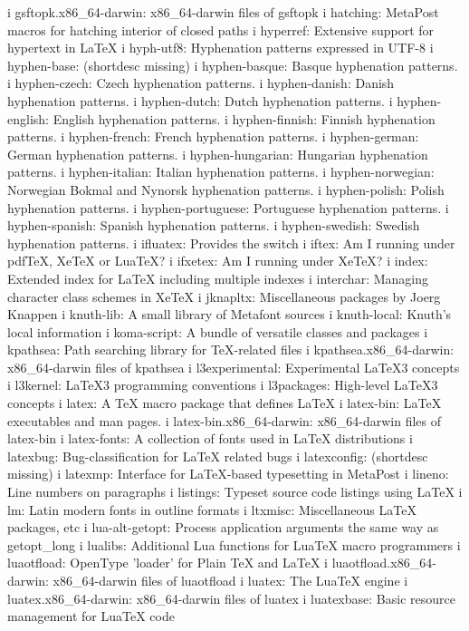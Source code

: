 i gsftopk.x86_64-darwin: x86_64-darwin files of gsftopk
i hatching: MetaPost macros for hatching interior of closed paths
i hyperref: Extensive support for hypertext in LaTeX
i hyph-utf8: Hyphenation patterns expressed in UTF-8
i hyphen-base: (shortdesc missing)
i hyphen-basque: Basque hyphenation patterns.
i hyphen-czech: Czech hyphenation patterns.
i hyphen-danish: Danish hyphenation patterns.
i hyphen-dutch: Dutch hyphenation patterns.
i hyphen-english: English hyphenation patterns.
i hyphen-finnish: Finnish hyphenation patterns.
i hyphen-french: French hyphenation patterns.
i hyphen-german: German hyphenation patterns.
i hyphen-hungarian: Hungarian hyphenation patterns.
i hyphen-italian: Italian hyphenation patterns.
i hyphen-norwegian: Norwegian Bokmal and Nynorsk hyphenation patterns.
i hyphen-polish: Polish hyphenation patterns.
i hyphen-portuguese: Portuguese hyphenation patterns.
i hyphen-spanish: Spanish hyphenation patterns.
i hyphen-swedish: Swedish hyphenation patterns.
i ifluatex: Provides the \ifluatex switch
i iftex: Am I running under pdfTeX, XeTeX or LuaTeX?
i ifxetex: Am I running under XeTeX?
i index: Extended index for LaTeX including multiple indexes
i interchar: Managing character class schemes in XeTeX
i jknapltx: Miscellaneous packages by Joerg Knappen
i knuth-lib: A small library of Metafont sources
i knuth-local: Knuth's local information
i koma-script: A bundle of versatile classes and packages
i kpathsea: Path searching library for TeX-related files
i kpathsea.x86_64-darwin: x86_64-darwin files of kpathsea
i l3experimental: Experimental LaTeX3 concepts
i l3kernel: LaTeX3 programming conventions
i l3packages: High-level LaTeX3 concepts
i latex: A TeX macro package that defines LaTeX
i latex-bin: LaTeX executables and man pages.
i latex-bin.x86_64-darwin: x86_64-darwin files of latex-bin
i latex-fonts: A collection of fonts used in LaTeX distributions
i latexbug: Bug-classification for LaTeX related bugs
i latexconfig: (shortdesc missing)
i latexmp: Interface for LaTeX-based typesetting in MetaPost
i lineno: Line numbers on paragraphs
i listings: Typeset source code listings using LaTeX
i lm: Latin modern fonts in outline formats
i ltxmisc: Miscellaneous LaTeX packages, etc
i lua-alt-getopt: Process application arguments the same way as getopt_long
i lualibs: Additional Lua functions for LuaTeX macro programmers
i luaotfload: OpenType 'loader' for Plain TeX and LaTeX
i luaotfload.x86_64-darwin: x86_64-darwin files of luaotfload
i luatex: The LuaTeX engine
i luatex.x86_64-darwin: x86_64-darwin files of luatex
i luatexbase: Basic resource management for LuaTeX code
